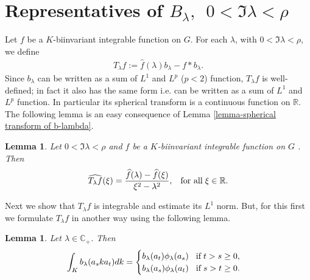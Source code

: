 \documentclass[11pt,reqno]{amsart}
\newtheorem{lemma}[theorem]{Lemma}
\theoremstyle{definition}
\theoremstyle{definition}
\numberwithin{equation}{section}
\begin{document}
\section{Representatives of $B_\lambda, \,\,\,0<\Im\lambda<\rho$}
Let $f$ be a $K$-biinvariant integrable function on $G$. For each $\lambda$, with $0<\Im\lambda<\rho$, we define
\begin{eqnarray}\label{definition of T-lambda-f}
T_\lambda f:=\widehat{f}(\lambda)b_\lambda -f*b_\lambda.
\end{eqnarray}
Since $b_\lambda$ can be written as a sum of $L^1$ and $L^p$ ($p<2$) function, $T_\lambda f$ is well-defined; in fact it also has the same form i.e. can be written as a sum of $L^1$ and $L^p$ function. In particular its spherical transform is a continuous function on $\mathbb{R}$. The following lemma is an easy consequence of Lemma \ref{lemma-spherical transform of b-lambda}. 

\begin{lemma}\label{spherical transform of T-lambda-f}
Let $0<\Im\lambda<\rho$ and $f$ be a $K$-biinvariant integrable function on $G$ . Then
$$
\widehat{T_\lambda f}(\xi)=\frac{\widehat{f}(\lambda)-\widehat{f}(\xi)}{\xi^2-\lambda^2},\hspace{3mm}\textup{for all}\hspace{1mm} \xi\in\mathbb{R}.
$$
\end{lemma}

Next we  show that $T_\lambda f$ is integrable and estimate its $L^1$ norm. But, for this first we formulate $T_\lambda f$ in another way using the following lemma.

\begin{lemma}\label{lemma-functional equation of b-lambda}
Let $\lambda\in\mathbb{C}_+$. Then
\begin{eqnarray*}\int_K b_\lambda(a_ska_t)dk=
\begin{cases}
b_\lambda(a_t)\phi_\lambda 
(a_s)\hspace{3mm}\textup{if}
\hspace{1mm}t> s\geq 0,\\
b_\lambda(a_s)\phi_\lambda(a_t)\hspace{3mm}\textup{if}
\hspace{1mm}s > t\geq 0.
\end{cases}
\end{eqnarray*}
\end{lemma}
\end{document}
